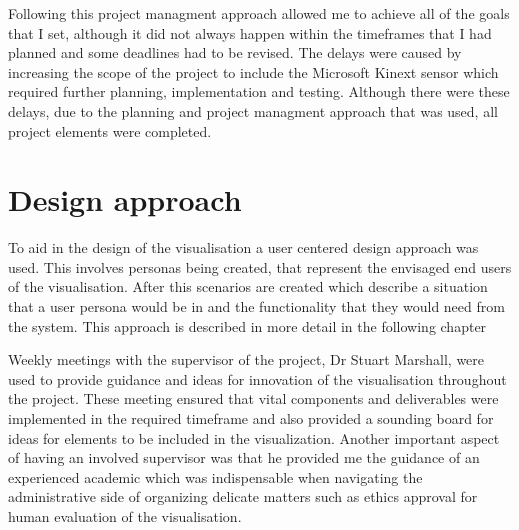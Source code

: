 Following this project managment approach allowed me to achieve all of the goals that I set, although it did not always happen within the timeframes that I had planned and some deadlines had to be revised. The delays were caused by increasing the scope of the project to include the Microsoft Kinext sensor which required further planning, implementation and testing. Although there were these delays, due to the planning and project managment approach that was used, all project elements were completed.


\section{Design approach}

To aid in the design of the visualisation a user centered design approach was used. This involves personas being created, that represent the envisaged end users of the visualisation. After this scenarios are created which describe a situation that a user persona would be in and the functionality that they would need from the system. This approach is described in more detail in the following chapter


Weekly meetings with the supervisor of the project, Dr Stuart Marshall, were used to provide guidance and ideas for innovation of the visualisation throughout the project. These meeting ensured that vital components and deliverables were implemented in the required timeframe and also provided a sounding board for ideas for elements to be included in the visualization. Another important aspect of having an involved supervisor was that he provided me the guidance of an experienced academic which was indispensable when navigating the administrative side of organizing delicate matters such as ethics approval for human evaluation of the visualisation.


